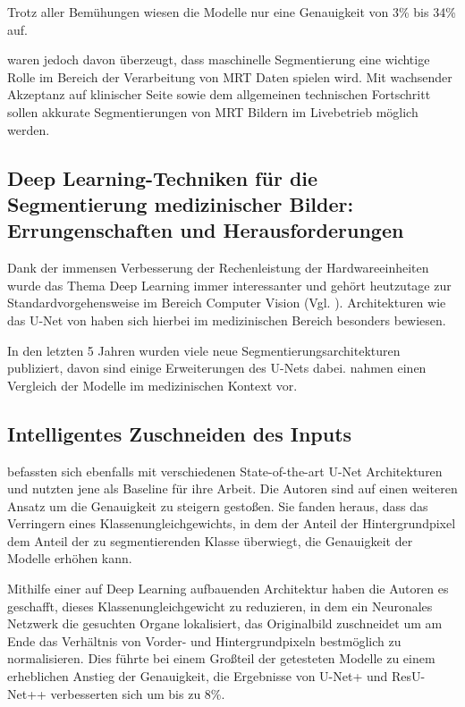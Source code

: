 Trotz aller Bemühungen wiesen die Modelle nur eine Genauigkeit von 3\% bis 34\% auf.

\citet{Clarke:Mri1995} waren jedoch davon überzeugt, dass maschinelle Segmentierung eine wichtige Rolle im Bereich der Verarbeitung von MRT Daten spielen wird. Mit wachsender Akzeptanz auf klinischer Seite sowie dem allgemeinen technischen Fortschritt sollen akkurate Segmentierungen von MRT Bildern im Livebetrieb möglich werden.

\newpage

\subsection{Deep Learning-Techniken für die Segmentierung medizinischer Bilder:
Errungenschaften und Herausforderungen}

Dank der immensen Verbesserung der Rechenleistung der Hardwareeinheiten wurde das Thema Deep Learning immer interessanter und gehört heutzutage zur Standardvorgehensweise im Bereich Computer Vision (Vgl. \citet{dl_medical_image}). Architekturen wie das U-Net von \citet{U-Net} haben sich hierbei im medizinischen Bereich besonders bewiesen. 

In den letzten 5 Jahren wurden viele neue Segmentierungsarchitekturen publiziert, davon sind einige Erweiterungen des U-Nets dabei. \citet{UnetMed} nahmen einen Vergleich der Modelle im medizinischen Kontext vor. 

\subsection{Intelligentes Zuschneiden des Inputs}

\citet{SmartCrop} befassten sich ebenfalls mit verschiedenen State-of-the-art U-Net Architekturen und nutzten jene als Baseline für ihre Arbeit. Die Autoren sind auf einen weiteren Ansatz um die Genauigkeit zu steigern gestoßen. Sie fanden heraus, dass das Verringern eines Klassenungleichgewichts, in dem der Anteil der Hintergrundpixel dem Anteil der zu segmentierenden Klasse überwiegt, die Genauigkeit der Modelle erhöhen kann.

Mithilfe einer auf Deep Learning aufbauenden Architektur haben die Autoren es geschafft, dieses Klassenungleichgewicht zu reduzieren, in dem ein Neuronales Netzwerk die gesuchten Organe lokalisiert, das Originalbild zuschneidet um am Ende das Verhältnis von Vorder- und Hintergrundpixeln bestmöglich zu normalisieren. Dies führte bei einem Großteil der getesteten Modelle zu einem erheblichen Anstieg der Genauigkeit, die Ergebnisse von U-Net+ und ResU-Net++ verbesserten sich um bis zu 8\%.

